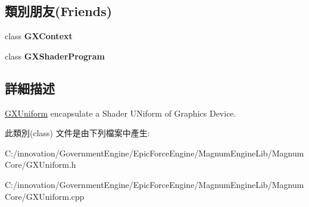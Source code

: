 \subsection*{類別朋友(Friends)}
\begin{DoxyCompactItemize}
\item 
class {\bfseries G\+X\+Context}\hypertarget{class_i_dream_sky_1_1_g_x_uniform_a2c36d7f8865080802bbad88cd73d871c}{}\label{class_i_dream_sky_1_1_g_x_uniform_a2c36d7f8865080802bbad88cd73d871c}

\item 
class {\bfseries G\+X\+Shader\+Program}\hypertarget{class_i_dream_sky_1_1_g_x_uniform_a4a6e107978c21d22d7e96be0f48962d2}{}\label{class_i_dream_sky_1_1_g_x_uniform_a4a6e107978c21d22d7e96be0f48962d2}

\end{DoxyCompactItemize}


\subsection{詳細描述}
\hyperlink{class_i_dream_sky_1_1_g_x_uniform}{G\+X\+Uniform} encapsulate a Shader U\+Niform of Graphics Device. 

此類別(class) 文件是由下列檔案中產生\+:\begin{DoxyCompactItemize}
\item 
C\+:/innovation/\+Government\+Engine/\+Epic\+Force\+Engine/\+Magnum\+Engine\+Lib/\+Magnum\+Core/G\+X\+Uniform.\+h\item 
C\+:/innovation/\+Government\+Engine/\+Epic\+Force\+Engine/\+Magnum\+Engine\+Lib/\+Magnum\+Core/G\+X\+Uniform.\+cpp\end{DoxyCompactItemize}
